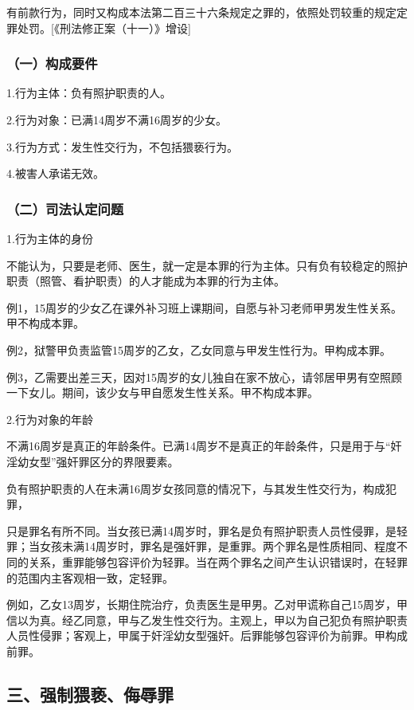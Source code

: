 有前款行为，同时又构成本法第二百三十六条规定之罪的，依照处罚较重的规定定罪处罚。[《刑法修正案（十一）》增设]

\subsubsection*{（一）构成要件}

1.行为主体：负有照护职责的人。

2.行为对象：已满14周岁不满16周岁的少女。

3.行为方式：发生性交行为，不包括猥亵行为。

4.被害人承诺无效。


\subsubsection*{（二）司法认定问题}

1.行为主体的身份

不能认为，只要是老师、医生，就一定是本罪的行为主体。只有负有较稳定的照护职责（照管、看护职责）的人才能成为本罪的行为主体。

例1，15周岁的少女乙在课外补习班上课期间，自愿与补习老师甲男发生性关系。甲不构成本罪。

例2，狱警甲负责监管15周岁的乙女，乙女同意与甲发生性行为。甲构成本罪。

例3，乙需要出差三天，因对15周岁的女儿独自在家不放心，请邻居甲男有空照顾一下女儿。期间，该少女与甲自愿发生性关系。甲不构成本罪。

2.行为对象的年龄

不满16周岁是真正的年龄条件。已满14周岁不是真正的年龄条件，只是用于与“奸淫幼女型”强奸罪区分的界限要素。

负有照护职责的人在未满16周岁女孩同意的情况下，与其发生性交行为，构成犯罪，

只是罪名有所不同。当女孩已满14周岁时，罪名是负有照护职责人员性侵罪，是轻罪；当女孩未满14周岁时，罪名是强奸罪，是重罪。两个罪名是性质相同、程度不同的关系，重罪能够包容评价为轻罪。当在两个罪名之间产生认识错误时，在轻罪的范围内主客观相一致，定轻罪。

例如，乙女13周岁，长期住院治疗，负责医生是甲男。乙对甲谎称自己15周岁，甲信以为真。经乙同意，甲与乙发生性交行为。主观上，甲以为自己犯负有照护职责人员性侵罪；客观上，甲属于奸淫幼女型强奸。后罪能够包容评价为前罪。甲构成前罪。

\subsection*{三、强制猥亵、侮辱罪}

